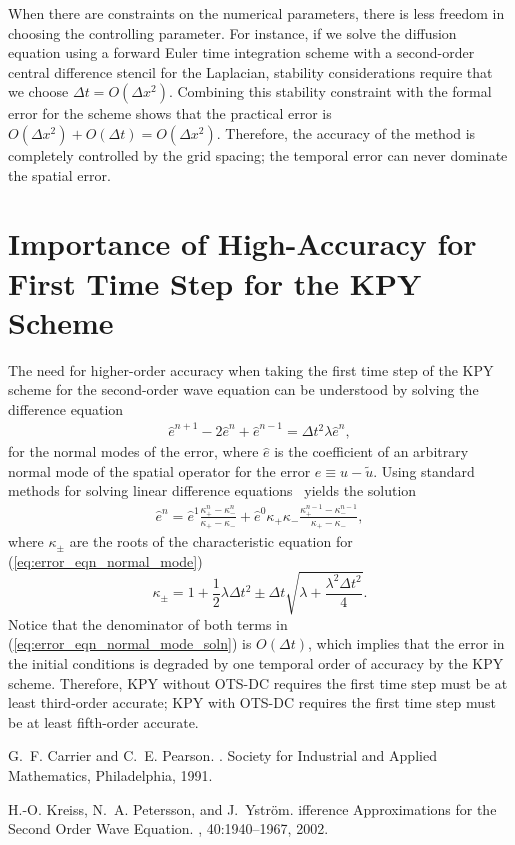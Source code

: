 \documentclass[fleqn,12pt,twoside]{article}
\newcommand{\beq}{\begin{equation}}
\newcommand{\eeq}{\end{equation}}
\newcommand{\bea}{\begin{eqnarray}}
\newcommand{\eea}{\end{eqnarray}}
\def\tu{\tilde{u}}
\def\he{\hat{e}}
\def\dt{\Delta t}
\def\dx{\Delta x}
\begin{document}
When there are constraints on the numerical parameters, there is less freedom 
in choosing the controlling parameter.  For instance, if we solve the 
diffusion equation using a forward Euler time integration scheme with a 
second-order central difference stencil for the Laplacian, stability
considerations require that we choose $\dt = O(\dx^2)$.  
Combining this stability constraint with the formal error for the scheme
shows that the practical error is 
$O(\dx^2) + O(\dt) = O(\dx^2)$.  Therefore, the accuracy of the 
method is completely controlled by the grid spacing; the temporal error can 
never dominate the spatial error.


\section{Importance of High-Accuracy for First Time Step for the KPY Scheme
         \label{appendix:KPY_analysis} }
The need for higher-order accuracy when taking the first time step of the KPY 
scheme for the second-order wave equation can be understood by solving the 
difference equation 
\bea
  \he^{n+1} - 2 \he^{n} + \he^{n-1} = \dt^2 \lambda \he^{n}
  \label{eq:error_eqn_normal_mode},
\eea
for the normal modes of the error, where $\he$ is the coefficient of an 
arbitrary normal mode of the spatial operator for the error 
$e \equiv u - \tu$.  Using standard methods for solving linear difference
equations~\cite{carrier_pearson_book} yields the solution
\bea
  \he^n = \he^1 \frac{\kappa_+^n - \kappa_-^n}{\kappa_+ - \kappa_-}
        + \he^0 \kappa_+ \kappa_-
          \frac{\kappa_+^{n-1} - \kappa_-^{n-1}}{\kappa_+ - \kappa_-},
  \label{eq:error_eqn_normal_mode_soln}
\eea
where $\kappa_\pm$ are the roots of the characteristic equation for
(\ref{eq:error_eqn_normal_mode})~\cite{kreiss2002}
\beq
  \kappa_\pm = 1 + \frac{1}{2} \lambda \dt^2
             \pm \dt \sqrt{\lambda + \frac{\lambda^2 \dt^2}{4}}.
\eeq
Notice that the denominator of both terms in
(\ref{eq:error_eqn_normal_mode_soln}) is $O(\dt)$, which implies that the
error in the initial conditions is degraded by one temporal order of accuracy
by the KPY scheme.  Therefore, KPY without OTS-DC requires the first time 
step must be at least third-order accurate; KPY with OTS-DC requires the 
first time step must be at least fifth-order accurate.



\begin{thebibliography}{10}

G.~F. Carrier and C.~E. Pearson.
.
\newblock Society for Industrial and Applied Mathematics, Philadelphia, 1991.

H.-O. Kreiss, N.~A. Petersson, and J.~Ystr\"om.
ifference {A}pproximations for the {S}econd {O}rder {W}ave
  {E}quation.
, 40:1940--1967, 2002.

\end{thebibliography}
\end{document}
